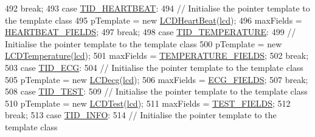 \begin{DoxyCode}
492               \textcolor{keywordflow}{break};
493               \textcolor{keywordflow}{case} \hyperlink{_l_c_d_templates_8h_a3123215c6e06adef7844e2618c2f44ac}{TID\_HEARTBEAT}:
494                 \textcolor{comment}{// Initialise the pointer template to the template class}
495                 pTemplate = \textcolor{keyword}{new} \hyperlink{class_l_c_d_heart_beat}{LCDHeartBeat}(\hyperlink{_meditech___chip_kit_control_panel_8pde_ae0b100905fb0ed88dddaafda0aa05379}{lcd});
496                 maxFields = \hyperlink{_l_c_d_templates_8h_ac4c63868ab082dc41339237e9bbbca4b}{HEARTBEAT\_FIELDS};
497               \textcolor{keywordflow}{break};
498               \textcolor{keywordflow}{case} \hyperlink{_l_c_d_templates_8h_a4be14e342b55951537f8c2c83ff5ea69}{TID\_TEMPERATURE}:
499                 \textcolor{comment}{// Initialise the pointer template to the template class}
500                 pTemplate = \textcolor{keyword}{new} \hyperlink{class_l_c_d_temperature}{LCDTemperature}(\hyperlink{_meditech___chip_kit_control_panel_8pde_ae0b100905fb0ed88dddaafda0aa05379}{lcd});
501                 maxFields = \hyperlink{_l_c_d_templates_8h_a111c40e86d424cf6b200349cf1575fda}{TEMPERATURE\_FIELDS};
502               \textcolor{keywordflow}{break};
503               \textcolor{keywordflow}{case} \hyperlink{_l_c_decg_8cpp_aa23412c6cd3b50876409b150c502a843}{TID\_ECG}:
504                 \textcolor{comment}{// Initialise the pointer template to the template class}
505                 pTemplate = \textcolor{keyword}{new} \hyperlink{class_l_c_decg}{LCDecg}(\hyperlink{_meditech___chip_kit_control_panel_8pde_ae0b100905fb0ed88dddaafda0aa05379}{lcd});
506                 maxFields = \hyperlink{_l_c_decg_8cpp_a58b6df1c594707bc5dc5ac6633fe7471}{ECG\_FIELDS};
507               \textcolor{keywordflow}{break};
508               \textcolor{keywordflow}{case} \hyperlink{_l_c_d_templates_8h_a1fa2d890c1a0373f3259708a83a43268}{TID\_TEST}:
509                 \textcolor{comment}{// Initialise the pointer template to the template class}
510                 pTemplate = \textcolor{keyword}{new} \hyperlink{class_l_c_d_test}{LCDTest}(\hyperlink{_meditech___chip_kit_control_panel_8pde_ae0b100905fb0ed88dddaafda0aa05379}{lcd});
511                 maxFields = \hyperlink{_l_c_d_templates_8h_a3f6d6cdb1650f9872fb2520b149c4902}{TEST\_FIELDS};
512               \textcolor{keywordflow}{break};
513               \textcolor{keywordflow}{case} \hyperlink{_l_c_d_templates_8h_aff20d279e92773f5794c520a9a9ab212}{TID\_INFO}:
514                 \textcolor{comment}{// Initialise the pointer template to the template class}

\end{DoxyCode}

